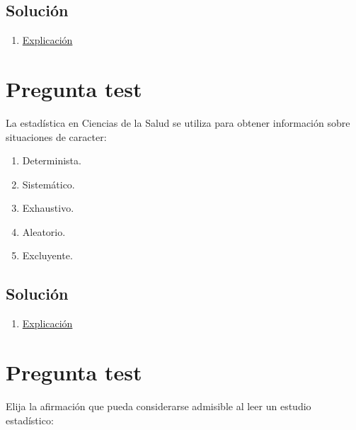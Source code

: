 \documentclass[
]{book}
\providecommand{\tightlist}{%
  \setlength{\itemsep}{0pt}\setlength{\parskip}{0pt}}
\begin{document}
\hypertarget{soluciuxf3n-6}{%
\subsection{Solución}\label{soluciuxf3n-6}}

\begin{enumerate}
\def\labelenumi{\alph{enumi})}
\setcounter{enumi}{1}
\tightlist
\item
  \href{https://1fjmanzano.github.io/bioestadistica/tipos-de-variables.html}{Explicación}
\end{enumerate}

\hypertarget{pregunta-test-5}{%
\section{Pregunta test}\label{pregunta-test-5}}

La estadística en Ciencias de la Salud se utiliza para obtener información sobre situaciones de caracter:

\begin{enumerate}
\def\labelenumi{\alph{enumi})}
\tightlist
\item
  Determinista.
\item
  Sistemático.
\item
  Exhaustivo.
\item
  Aleatorio.
\item
  Excluyente.
\end{enumerate}

\hypertarget{soluciuxf3n-7}{%
\subsection{Solución}\label{soluciuxf3n-7}}

\begin{enumerate}
\def\labelenumi{\alph{enumi})}
\setcounter{enumi}{3}
\tightlist
\item
  \href{https://1fjmanzano.github.io/bioestadistica/inferencia-estad\%C3\%ADstica.html}{Explicación}
\end{enumerate}

\hypertarget{pregunta-test-6}{%
\section{Pregunta test}\label{pregunta-test-6}}

Elija la afirmación que pueda considerarse admisible al leer un estudio estadístico:
\end{document}
